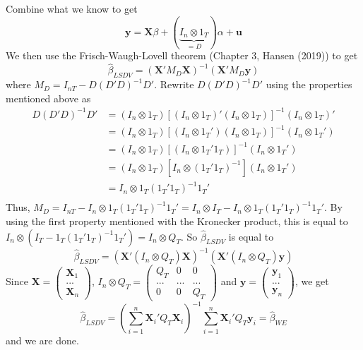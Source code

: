 \documentclass[12pt]{article}
\theoremstyle{definition}
\theoremstyle{property}
\theoremstyle{assumption}
\theoremstyle{example}
\theoremstyle{comment}
\begin{document}
\begin{itemize}
\[\]
Combine what we know to get 
\[
\mathbf{y} = \mathbf{X}\beta+(\underbrace{I_n\otimes 1_T}_{=D})\alpha+\mathbf{u}
\]
We then use the Frisch-Waugh-Lovell theorem (Chapter 3, Hansen (2019)) to get
\[
\hat{\beta}_{LSDV}=(\mathbf{X}'M_D\mathbf{X})^{-1}(\mathbf{X}'M_D\mathbf{y})
\]
where $M_D = I_{nT}-D(D'D)^{-1}D'$. Rewrite $D(D'D)^{-1}D'$ using the properties mentioned above as
\[
\begin{aligned}
D(D'D)^{-1}D'&=(I_n\otimes 1_T)[(I_n\otimes 1_T)'(I_n\otimes 1_T)]^{-1}(I_n\otimes 1_T)'\\
&=(I_n\otimes 1_T)[(I_n\otimes 1_T')(I_n\otimes 1_T)]^{-1}(I_n\otimes 1_T')\\
&=(I_n\otimes 1_T)[(I_n\otimes 1_T'1_T)]^{-1}(I_n\otimes 1_T')\\
&=(I_n\otimes 1_T)[I_n\otimes (1_T'1_T)^{-1}](I_n\otimes 1_T')\\
&=I_n\otimes 1_T(1_T'1_T)^{-1}1_T'\\
\end{aligned}
\]
Thus, $M_D = I_{nT} - I_n\otimes 1_T(1_T'1_T)^{-1}1_T'=I_n\otimes I_T -I_n\otimes  1_T(1_T'1_T)^{-1}1_T'$. By using the first property mentioned with the Kronecker product, this is equal to $I_n\otimes(I_T - 1_T(1_T'1_T)^{-1}1_T')=I_n\otimes Q_T$. So $\hat{\beta}_{LSDV}$ is equal to
\[
\hat{\beta}_{LSDV}=(\mathbf{X}'(I_n\otimes Q_T)\mathbf{X})^{-1}(\mathbf{X}'(I_n\otimes Q_T)\mathbf{y})
\]
Since $\mathbf{X} = \begin{pmatrix}\mathbf{X}_1\\ ... \\ \mathbf{X}_n \end{pmatrix}$, $I_n\otimes Q_T =  \begin{pmatrix}Q_T & 0 & 0 \\ ...&...&...\\0 & 0 & Q_T \end{pmatrix}$ and $\mathbf{y} = \begin{pmatrix}\mathbf{y}_1\\ ... \\ \mathbf{y}_n \end{pmatrix}$, we get
\[
\hat{\beta}_{LSDV}=\left(\sum_{i=1}^n \mathbf{X}_i'Q_T \mathbf{X}_i\right)^{-1}\sum_{i=1}^n \mathbf{X}_i'Q_T \mathbf{y}_i = \hat{\beta}_{WE}
\]
and we are done.
\end{itemize}
\end{document}
